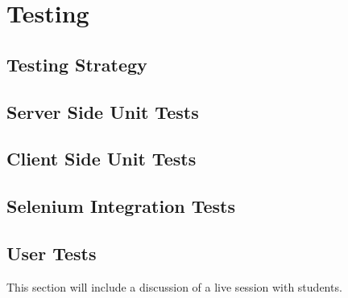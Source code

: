 \chapter{Testing}

\section{Testing Strategy}
\section{Server Side Unit Tests}
\section{Client Side Unit Tests}
\section{Selenium Integration Tests}


\section{User Tests}
This section will include a discussion of a live session with students.

%
%
%
%
%

